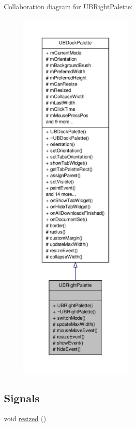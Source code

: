Collaboration diagram for U\-B\-Right\-Palette\-:
\nopagebreak
\begin{figure}[H]
\begin{center}
\leavevmode
\includegraphics[height=550pt]{d3/dcb/class_u_b_right_palette__coll__graph}
\end{center}
\end{figure}
\subsection*{Signals}
\begin{DoxyCompactItemize}
\item 
void \hyperlink{class_u_b_right_palette_a1bc9b3c37f8e84459e8391e1e9c4a7d0}{resized} ()
\end{DoxyCompactItemize}
